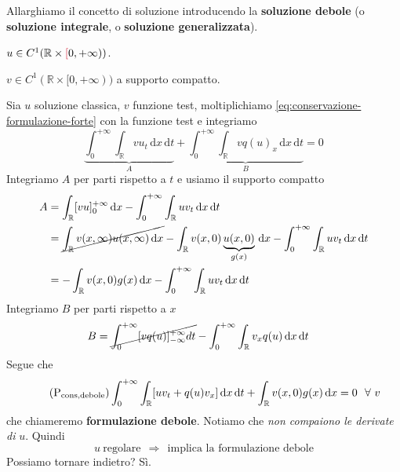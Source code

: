 \documentclass[10pt,a4paper,twoside,openright]{book}
\newcommand{\de}{\,\mathrm d}
\newcommand{\dx}{\de x}
\newcommand{\dt}{\de t}
\begin{document}
Allarghiamo il concetto di soluzione introducendo la \textbf{soluzione debole} (o \textbf{soluzione integrale}, o \textbf{soluzione generalizzata}).
\begin{definition}
     $u\in C^{1}(\mathbb{R} \times \textcolor[rgb]{0.82,0.01,0.11}{[} 0,+\infty))$.
\end{definition}
\begin{definition}
     $v\in C^{1}(\mathbb{R} \times [ 0,+\infty))$ a supporto compatto.
\end{definition}
Sia $u$ soluzione classica, $v$ funzione test, moltiplichiamo \eqref{eq:conservazione-formulazione-forte} con la funzione test e integriamo
\begin{equation*}
    \underbrace{\int ^{+\infty }_{0}\int _{\mathbb{R}} vu_{t} \dx\dt}_{A} +\underbrace{\int ^{+\infty }_{0}\int _{\mathbb{R}} vq(u)_{x} \dx\dt}_{B} =0
\end{equation*}
Integriamo $A$ per parti rispetto a $t$ e usiamo il supporto compatto
\begin{align*}
    A & =\int _{\mathbb{R}}[ vu]^{+\infty }_{0} \dx-\int ^{+\infty }_{0}\int _{\mathbb{R}} uv_{t} \dx\dt                                                                        \\
      & = \cancel{\int _{\mathbb{R}} v(x,\infty) u(x,\infty) \dx} -\int _{\mathbb{R}} v(x,0)\underbrace{u(x,0)}_{g(x)} \dx-\int ^{+\infty }_{0}\int _{\mathbb{R}} uv_{t} \dx\dt \\
      & =-\int _{\mathbb{R}} v(x,0) g(x) \dx-\int ^{+\infty }_{0}\int _{\mathbb{R}} uv_{t} \dx\dt
\end{align*}
Integriamo $B$ per parti rispetto a $x$
\begin{align*}
    B & =\cancel{\int ^{+\infty }_{0}[ vq(u)]^{+\infty }_{-\infty } dt} -\int ^{+\infty }_{0}\int _{\mathbb{R}} v_{x} q(u) \dx\dt
\end{align*}
Segue che
\begin{equation}
    \tag{P$_{\text{cons,debole}}$}
    \int ^{+\infty }_{0}\int _{\mathbb{R}}[ uv_{t} +q(u) v_{x}] \dx\dt+\int _{\mathbb{R}} v(x,0) g(x) \dx=0\ \ \forall \ v
    \label{eq:conservazione-formulazione-debole}
\end{equation}
che chiameremo \textbf{formulazione debole}. Notiamo che \textit{non compaiono le derivate di} $u$. Quindi
\begin{equation*}
    u\ \text{regolare} \ \ \Rightarrow \ \ \text{implica la formulazione debole}
\end{equation*}
Possiamo tornare indietro? Sì.
\end{document}
